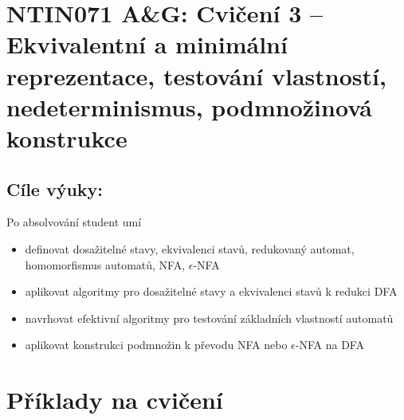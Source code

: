 \documentclass[a4paper,12pt]{amsart}
\begin{document}
\thispagestyle{empty}

\section*{NTIN071 A\&G: Cvičení 3 -- Ekvivalentní a minimální reprezentace, testování vlastností, nedeterminismus, podmnožinová konstrukce}

\medskip

\subsection*{Cíle výuky:} Po absolvování student umí

\begin{itemize}\setlength{\itemsep}{0pt}
    \item definovat dosažitelné stavy, ekvivalenci stavů, redukovaný automat, homomorfismus automatů, NFA, $\epsilon$-NFA
    \item aplikovat algoritmy pro dosažitelné stavy a ekvivalenci stavů k redukci DFA
    \item navrhovat efektivní algoritmy pro testování základních vlastností automatů
    \item aplikovat konstrukci podmnožin k převodu NFA nebo $\epsilon$-NFA na DFA
\end{itemize}

\section*{Příklady na cvičení}
\end{document}
